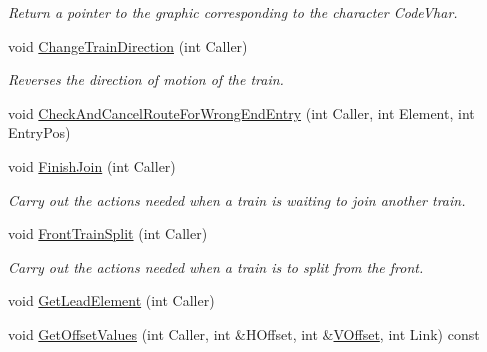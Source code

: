 \begin{DoxyCompactItemize}
\begin{DoxyCompactList}\small\item\em Return a pointer to the graphic corresponding to the character \textquotesingle{}Code\+Vhar\textquotesingle{}. \end{DoxyCompactList}\item 
\mbox{\label{class_t_train_a406c172a0ba96802ada1aa04d78948d0}} 
void \mbox{\hyperlink{class_t_train_a406c172a0ba96802ada1aa04d78948d0}{Change\+Train\+Direction}} (int Caller)
\begin{DoxyCompactList}\small\item\em Reverses the direction of motion of the train. \end{DoxyCompactList}\item 
void \mbox{\hyperlink{class_t_train_a50997f7e8138a7e6a147fe3b5ad21b84}{Check\+And\+Cancel\+Route\+For\+Wrong\+End\+Entry}} (int Caller, int Element, int Entry\+Pos)
\item 
\mbox{\label{class_t_train_ab9edf458753619f8cd25f0165484d26f}} 
void \mbox{\hyperlink{class_t_train_ab9edf458753619f8cd25f0165484d26f}{Finish\+Join}} (int Caller)
\begin{DoxyCompactList}\small\item\em Carry out the actions needed when a train is waiting to join another train. \end{DoxyCompactList}\item 
\mbox{\label{class_t_train_ad666fb061d1da7c44a72ec963c2098aa}} 
void \mbox{\hyperlink{class_t_train_ad666fb061d1da7c44a72ec963c2098aa}{Front\+Train\+Split}} (int Caller)
\begin{DoxyCompactList}\small\item\em Carry out the actions needed when a train is to split from the front. \end{DoxyCompactList}\item 
void \mbox{\hyperlink{class_t_train_a0675ea1dede706d5b0dd52264496865a}{Get\+Lead\+Element}} (int Caller)
\item 
\mbox{\label{class_t_train_aa973b7a0ecaef5077fd56398419f9104}} 
void \mbox{\hyperlink{class_t_train_aa973b7a0ecaef5077fd56398419f9104}{Get\+Offset\+Values}} (int Caller, int \&H\+Offset, int \&\mbox{\hyperlink{class_t_train_a4c8b153a620229a3d9cc54f64ffa5f4a}{V\+Offset}}, int Link) const

\end{DoxyCompactItemize}
